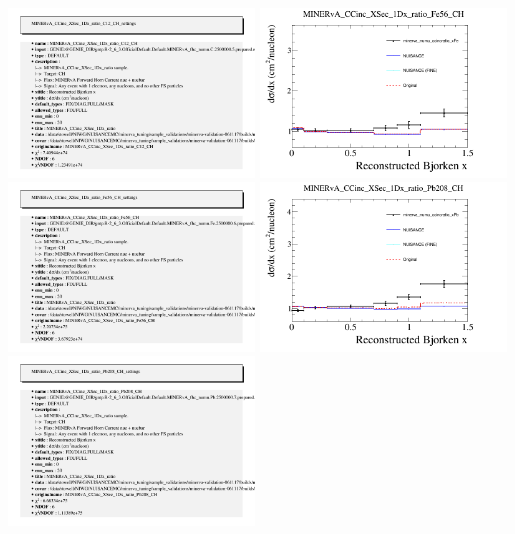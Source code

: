 \documentclass{article}
\begin{document}
\includegraphics[width=0.49\textwidth]{figures/minerva_numu_ccincratio_xC_info.png}
\centering
\includegraphics[width=0.49\textwidth]{figures/minerva_numu_ccincratio_xFe_comp.png}
\includegraphics[width=0.49\textwidth]{figures/minerva_numu_ccincratio_xFe_info.png}
\centering
\includegraphics[width=0.49\textwidth]{figures/minerva_numu_ccincratio_xPb_comp.png}
\includegraphics[width=0.49\textwidth]{figures/minerva_numu_ccincratio_xPb_info.png}
\end{document}

